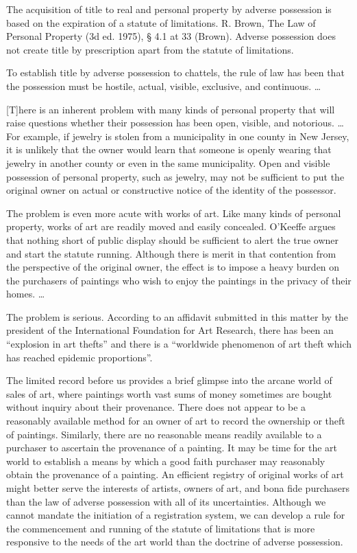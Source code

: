 
The acquisition of title to real and personal property by adverse possession is
based on the expiration of a statute of limitations. R. Brown, The Law of
Personal Property (3d ed. 1975), {\S} 4.1 at 33 (Brown). Adverse possession
does not create title by prescription apart from the statute of limitations.

To establish title by adverse possession to chattels, the rule of law has been
that the possession must be hostile, actual, visible, exclusive, and
continuous. \ldots

[T]here is an inherent problem with many kinds of personal property that will
raise questions whether their possession has been open, visible, and notorious.
\ldots For example, if jewelry is stolen from a municipality in one county in
New Jersey, it is unlikely that the owner would learn that someone is openly
wearing that jewelry in another county or even in the same municipality. Open
and visible possession of personal property, such as jewelry, may not be
sufficient to put the original owner on actual or constructive notice of the
identity of the possessor.

The problem is even more acute with works of art. Like many kinds of personal
property, works of art are readily moved and easily concealed. O'Keeffe argues
that nothing short of public display should be sufficient to alert the true
owner and start the statute running. Although there is merit in that contention
from the perspective of the original owner, the effect is to impose a heavy
burden on the purchasers of paintings who wish to enjoy the paintings in the
privacy of their homes. \ldots

The problem is serious. According to an affidavit submitted in this matter by
the president of the International Foundation for Art Research, there has been
an ``explosion in art thefts'' and there is a ``worldwide phenomenon of art
theft which has reached epidemic proportions''.

The limited record before us provides a brief glimpse into the arcane world of
sales of art, where paintings worth vast sums of money sometimes are bought
without inquiry about their provenance. There does not appear to be a
reasonably available method for an owner of art to record the ownership or
theft of paintings. Similarly, there are no reasonable means readily available
to a purchaser to ascertain the provenance of a painting. It may be time for
the art world to establish a means by which a good faith purchaser may
reasonably obtain the provenance of a painting. An efficient registry of
original works of art might better serve the interests of artists, owners of
art, and bona fide purchasers than the law of adverse possession with all of
its uncertainties. Although we cannot mandate the initiation of a registration
system, we can develop a rule for the commencement and running of the statute
of limitations that is more responsive to the needs of the art world than the
doctrine of adverse possession.

